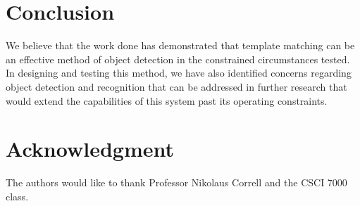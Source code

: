 \documentclass[conference]{IEEEtran}
\begin{document}
\section{Conclusion}
We believe that the work done has demonstrated that template matching can be an effective method of object detection in the constrained circumstances tested.  In designing and testing this method, we have also identified concerns regarding object detection and recognition that can be addressed in further research that would extend the capabilities of this system past its operating constraints.



\section*{Acknowledgment}

The authors would like to thank Professor Nikolaus Correll and the CSCI 7000 class.




\end{document}
